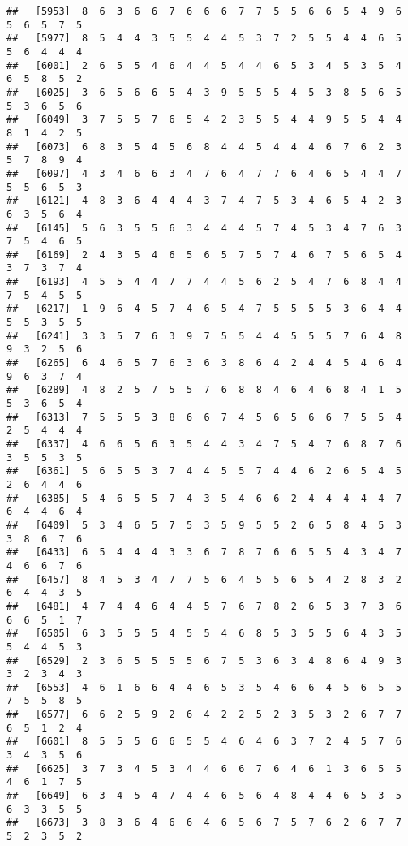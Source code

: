 \documentclass[
]{book}
\begin{document}
\begin{verbatim}
##   [5953]  8  6  3  6  6  7  6  6  6  7  7  5  5  6  6  5  4  9  6  5  6  5  7  5
##   [5977]  8  5  4  4  3  5  5  4  4  5  3  7  2  5  5  4  4  6  5  5  6  4  4  4
##   [6001]  2  6  5  5  4  6  4  4  5  4  4  6  5  3  4  5  3  5  4  6  5  8  5  2
##   [6025]  3  6  5  6  6  5  4  3  9  5  5  5  4  5  3  8  5  6  5  5  3  6  5  6
##   [6049]  3  7  5  5  7  6  5  4  2  3  5  5  4  4  9  5  5  4  4  8  1  4  2  5
##   [6073]  6  8  3  5  4  5  6  8  4  4  5  4  4  4  6  7  6  2  3  5  7  8  9  4
##   [6097]  4  3  4  6  6  3  4  7  6  4  7  7  6  4  6  5  4  4  7  5  5  6  5  3
##   [6121]  4  8  3  6  4  4  4  3  7  4  7  5  3  4  6  5  4  2  3  6  3  5  6  4
##   [6145]  5  6  3  5  5  6  3  4  4  4  5  7  4  5  3  4  7  6  3  7  5  4  6  5
##   [6169]  2  4  3  5  4  6  5  6  5  7  5  7  4  6  7  5  6  5  4  3  7  3  7  4
##   [6193]  4  5  5  4  4  7  7  4  4  5  6  2  5  4  7  6  8  4  4  7  5  4  5  5
##   [6217]  1  9  6  4  5  7  4  6  5  4  7  5  5  5  5  3  6  4  4  5  5  3  5  5
##   [6241]  3  3  5  7  6  3  9  7  5  5  4  4  5  5  5  7  6  4  8  9  3  2  5  6
##   [6265]  6  4  6  5  7  6  3  6  3  8  6  4  2  4  4  5  4  6  4  9  6  3  7  4
##   [6289]  4  8  2  5  7  5  5  7  6  8  8  4  6  4  6  8  4  1  5  5  3  6  5  4
##   [6313]  7  5  5  5  3  8  6  6  7  4  5  6  5  6  6  7  5  5  4  2  5  4  4  4
##   [6337]  4  6  6  5  6  3  5  4  4  3  4  7  5  4  7  6  8  7  6  3  5  5  3  5
##   [6361]  5  6  5  5  3  7  4  4  5  5  7  4  4  6  2  6  5  4  5  2  6  4  4  6
##   [6385]  5  4  6  5  5  7  4  3  5  4  6  6  2  4  4  4  4  4  7  6  4  4  6  4
##   [6409]  5  3  4  6  5  7  5  3  5  9  5  5  2  6  5  8  4  5  3  3  8  6  7  6
##   [6433]  6  5  4  4  4  3  3  6  7  8  7  6  6  5  5  4  3  4  7  4  6  6  7  6
##   [6457]  8  4  5  3  4  7  7  5  6  4  5  5  6  5  4  2  8  3  2  6  4  4  3  5
##   [6481]  4  7  4  4  6  4  4  5  7  6  7  8  2  6  5  3  7  3  6  6  6  5  1  7
##   [6505]  6  3  5  5  5  4  5  5  4  6  8  5  3  5  5  6  4  3  5  5  4  4  5  3
##   [6529]  2  3  6  5  5  5  5  6  7  5  3  6  3  4  8  6  4  9  3  3  2  3  4  3
##   [6553]  4  6  1  6  6  4  4  6  5  3  5  4  6  6  4  5  6  5  5  7  5  5  8  5
##   [6577]  6  6  2  5  9  2  6  4  2  2  5  2  3  5  3  2  6  7  7  6  5  1  2  4
##   [6601]  8  5  5  5  6  6  5  5  4  6  4  6  3  7  2  4  5  7  6  3  4  3  5  6
##   [6625]  3  7  3  4  5  3  4  4  6  6  7  6  4  6  1  3  6  5  5  4  6  1  7  5
##   [6649]  6  3  4  5  4  7  4  4  6  5  6  4  8  4  4  6  5  3  5  6  3  3  5  5
##   [6673]  3  8  3  6  4  6  6  4  6  5  6  7  5  7  6  2  6  7  7  5  2  3  5  2

\end{verbatim}
\end{document}

